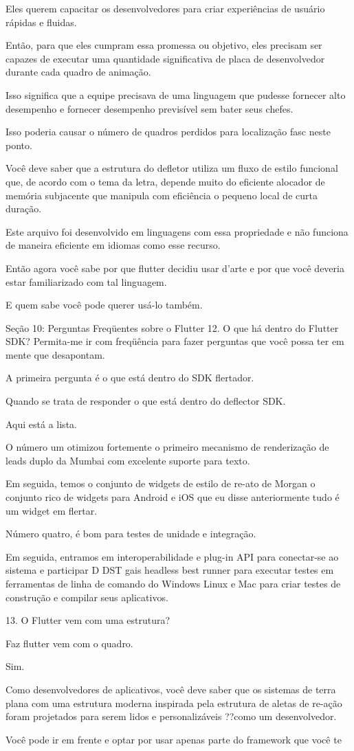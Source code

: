 Eles querem capacitar os desenvolvedores para criar experiências de usuário rápidas e fluidas.

Então, para que eles cumpram essa promessa ou objetivo, eles precisam ser capazes de executar uma quantidade significativa de placa de desenvolvedor durante cada quadro de animação.

Isso significa que a equipe precisava de uma linguagem que pudesse fornecer alto desempenho e fornecer desempenho previsível sem bater seus chefes.

Isso poderia causar o número de quadros perdidos para localização fasc neste ponto.

Você deve saber que a estrutura do defletor utiliza um fluxo de estilo funcional que, de acordo com o tema da letra, depende muito do eficiente alocador de memória subjacente que manipula com eficiência o pequeno local de curta duração.

Este arquivo foi desenvolvido em linguagens com essa propriedade e não funciona de maneira eficiente em idiomas como esse recurso.

Então agora você sabe por que flutter decidiu usar d'arte e por que você deveria estar familiarizado com tal linguagem.

E quem sabe você pode querer usá-lo também.


Seção 10: Perguntas Freqüentes sobre o Flutter
12. O que há dentro do Flutter SDK?
Permita-me ir com freqüência para fazer perguntas que você possa ter em mente que desapontam.

A primeira pergunta é o que está dentro do SDK flertador.

Quando se trata de responder o que está dentro do deflector SDK.

Aqui está a lista.

O número um otimizou fortemente o primeiro mecanismo de renderização de leads duplo da Mumbai com excelente suporte para texto.

Em seguida, temos o conjunto de widgets de estilo de re-ato de Morgan o conjunto rico de widgets para Android e iOS que eu disse anteriormente tudo é um widget em flertar.

Número quatro, é bom para testes de unidade e integração.

Em seguida, entramos em interoperabilidade e plug-in API para conectar-se ao sistema e participar D DST gais headless best runner para executar testes em ferramentas de linha de comando do Windows Linux e Mac para criar testes de construção e compilar seus aplicativos.

13. O Flutter vem com uma estrutura?

Faz flutter vem com o quadro.

Sim.

Como desenvolvedores de aplicativos, você deve saber que os sistemas de terra plana com uma estrutura moderna inspirada pela estrutura de aletas de re-ação foram projetados para serem lidos e personalizáveis ??como um desenvolvedor.

Você pode ir em frente e optar por usar apenas parte do framework que você te